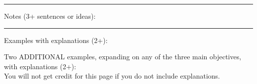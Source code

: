 \documentclass{article}
\theoremstyle{plain}
\theoremstyle{definition}
\theoremstyle{remark}
\begin{document}
\vspace{1in}
\hrule
\vspace{0.1in}
\large \noindent Notes (3+ sentences or ideas):
\normalsize
\vspace{1.75in}
\hrule
\vspace{0.1in}

\large \noindent Examples with explanations (2+):\\
\normalsize


\newpage
%
%

\large \noindent Two ADDITIONAL examples, expanding on any of the three main objectives, with explanations (2+):\\
You will not get credit for this page if you do not include explanations.
\end{document}
